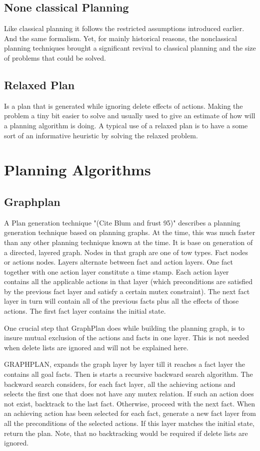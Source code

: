 \documentclass
[a4paper
,english
,parskip=half
,bibliography=totoc
]{scrreprt}
\begin{document}
        \subsection{None classical Planning}
        Like classical planning it follows the restricted assumptions introduced earlier. And the same formalism. Yet, for mainly historical reasons, the nonclassical planning techniques brought a significant revival to classical planning and the size of problems that could be solved.  

        \subsection{Relaxed Plan}
        Is a plan that is generated while ignoring delete effects of actions. Making the problem a tiny bit easier to solve and usually used to give an estimate of how will a planning algorithm is doing. A typical use of a relaxed plan is to have a some sort of an informative heuristic by solving the relaxed problem. 
    
    \section{Planning Algorithms}
        \subsection{Graphplan}
        A Plan generation technique "(Cite Blum and frust 95)" describes a planning generation technique based on planning graphs. At the time, this was much faster than any other planning technique known at the time. It is base on generation of a directed, layered graph. Nodes in that graph are one of tow types. Fact nodes or actions nodes. Layers alternate between fact and action layers. One fact together with one action layer constitute a time stamp. Each action layer contains all the applicable actions in that layer (which preconditions are satisfied by the previous fact layer and satisfy a certain mutex constraint). The next fact layer in turn will contain all of the previous facts plus all the effects of those actions. The first fact layer contains the initial state.

        One crucial step that GraphPlan does while building the planning graph, is to insure mutual exclusion of the actions and facts in one layer. This is not needed when delete lists are ignored and will not be explained here.

        GRAPHPLAN, expands the graph layer by layer till it reaches a fact layer the contains all goal facts. Then is starts a recursive backward search algorithm. The backward search considers, for each fact layer, all the achieving actions and selects the first one that does not have any mutex relation. If such an action does not exist, backtrack to the last fact. Otherwise, proceed with the next fact. When an achieving action has been selected for each fact, generate a new fact layer from all the preconditions of the selected actions. If this layer matches the initial state, return the plan. Note, that no backtracking would be required if delete lists are ignored.
\end{document}
